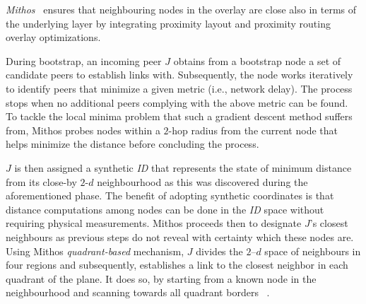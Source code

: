 




\emph{Mithos}~\cite{WR2003} ensures that neighbouring nodes in the overlay are
close also in terms of the underlying layer by integrating proximity layout
and proximity routing overlay optimizations.

During bootstrap, an incoming peer $J$ obtains from a bootstrap node a set of
candidate peers to establish links with. 
Subsequently, the node works iteratively to identify peers that minimize
a given metric (i.e., network delay).
The process stops when no additional peers complying with the above metric 
can be found. 
% 
To tackle the local
minima problem that such a gradient descent method suffers from, Mithos probes
nodes within a $2$-hop radius from the current node that helps minimize
the distance before concluding the process.

$J$ is then assigned a synthetic \emph{ID} that
represents the state of minimum distance from its close-by $2$-$d$ neighbourhood as
this was discovered during the aforementioned phase. %
The benefit of adopting synthetic coordinates is that distance computations
among nodes can be done in the \emph{ID} space without requiring physical
measurements. 
Mithos proceeds then to designate $J$'s closest neighbours as 
previous steps do not reveal with certainty which these nodes are.
Using Mithos \emph{quadrant-based} mechanism,
$J$  divides the $2$--$d$ space of neighbours in four regions and 
subsequently, establishes a link 
to the closest neighbor in each quadrant of the plane. 
It does so, by starting from a known node in the neighbourhood
and scanning towards all quadrant borders ~\cite{KK2000,R2002}. 

